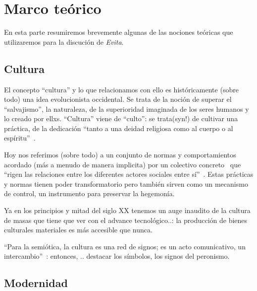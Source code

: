 \section{Marco teórico}

En esta parte resumiremos brevemente algunas de las nociones teóricas que utilizaremos para la discución de \textit{Evita}.

\subsection{Cultura}

El concepto ``cultura'' y lo que relacionamos con ello es históricamente (sobre todo) una idea evolucionista occidental.
Se trata de la noción de superar el ``salvajismo'', la naturaleza, de la superioridad imaginada de los seres humanos y lo creado por ellxs.
``Cultura'' viene de ``culto'': se trata(syn!) de cultivar una práctica, de la dedicación ``tanto a una deidad religiosa como al cuerpo o al espíritu''~\autocite[71]{SzIr2009}.

Hoy nos referimos (sobre todo) a un conjunto de normas y comportamientos acordado (más a menudo de manera implicita) por un colectivo concreto~\autocite[52]{GKS2016} que ``rigen las relaciones entre los diferentes actores sociales entre sí''~\autocite[48]{SzIr2009}.
Estas prácticas y normas tienen poder transformatorio pero también sirven como un mecanismo de control, un instrumento para preservar la hegemonía.

Ya en los principios y mitad del siglo XX tenemos un auge inaudito de la cultura de masas que tiene que ver con el advance tecnológico..:
la producción de bienes culturales materiales es más accesible que nunca.

``Para la semiótica, la cultura es una red de signos; es un acto comunicativo, un intercambio''~\autocite[71]{SzIr2009}:
entonces, .. destacar los símbolos, los signos del peronismo.

\begin{comment}
* cultura/campo cultural y su rol en la formación de la nación
  * símbolos del Peronismo? (vgl auch marco histórico)
      * "Para la semiótica, la cultura es una red de signos; es un acto comunicativo, un intercambio"~\cite{SzIr2009}{p.71}
  * cultura de masas; imprenta; todo el mundo puede leer
\end{comment}

\subsection{Modernidad}

